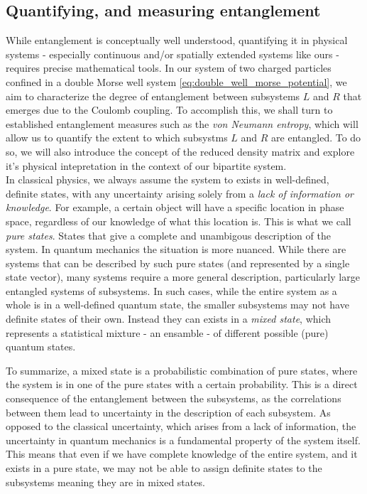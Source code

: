 \documentclass{subfiles}
\begin{document}
\subsection{Quantifying, and measuring entanglement}
While entanglement is conceptually well understood, quantifying it in physical systems - especially continuous and/or spatially extended systems like ours - requires precise mathematical tools. In our system of two charged particles confined in a double Morse well system \eqref{eq:double_well_morse_potential}, we aim to characterize the degree of entanglement between subsystems $L$ and $R$ that emerges due to the Coulomb coupling. To accomplish this, we shall turn to established entanglement measures such as the \emph{von Neumann entropy}, which will allow us to quantify the extent to which subsystms $L$ and $R$ are entangled. To do so, we will also introduce the concept of the reduced density matrix and explore it's physical intepretation in the context of our bipartite system. \\

In classical physics, we always assume the system to exists in well-defined, definite states, with any uncertainty arising solely from a \emph{lack of information or knowledge}. For example, a certain object will have a specific location in phase space, regardless of our knowledge of what this location is. This is what we call \emph{pure states}. States that give a complete and unambigous description of the system. In quantum mechanics the situation is more nuanced. While there are systems that can be described by such pure states (and represented by a single state vector), many systems require a more general description, particularly large entangled systems of subsystems. In such cases, while the entire system as a whole is in a well-defined quantum state, the smaller subsystems may not have definite states of their own. Instead they can exists in a \emph{mixed state}, which represents a statistical mixture - an ensamble - of different possible (pure) quantum states.

To summarize, a mixed state is a probabilistic combination of pure states, where the system is in one of the pure states with a certain probability. This is a direct consequence of the entanglement between the subsystems, as the correlations between them lead to uncertainty in the description of each subsystem. As opposed to the classical uncertainty, which arises from a lack of information, the uncertainty in quantum mechanics is a fundamental property of the system itself. This means that even if we have complete knowledge of the entire system, and it exists in a pure state, we may not be able to assign definite states to the subsystems meaning they are in mixed states\cite{sakurai1986modern, berera2021quantum, griffiths2018introduction}. 
\\ 
\end{document}
